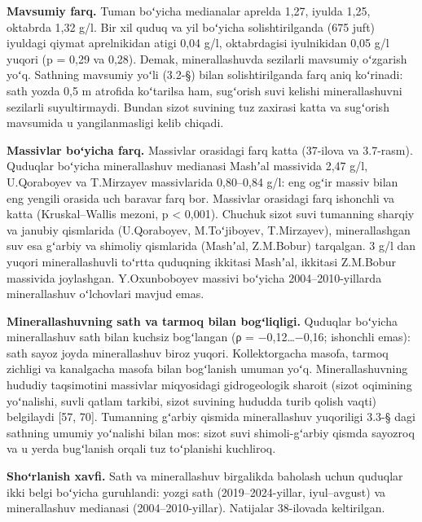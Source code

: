 \textbf{Mavsumiy farq.} Tuman boʻyicha medianalar aprelda 1,27, iyulda
1,25, oktabrda 1,32 g/l. Bir xil quduq va yil boʻyicha solishtirilganda
(675 juft) iyuldagi qiymat aprelnikidan atigi 0,04 g/l, oktabrdagisi
iyulnikidan 0,05 g/l yuqori (p = 0,29 va 0,28). Demak, minerallashuvda
sezilarli mavsumiy oʻzgarish yoʻq. Sathning mavsumiy yoʻli (3.2-§) bilan
solishtirilganda farq aniq koʻrinadi: sath yozda 0,5 m atrofida
koʻtarilsa ham, sugʻorish suvi kelishi minerallashuvni sezilarli
suyultirmaydi. Bundan sizot suvining tuz zaxirasi katta va sugʻorish
mavsumida u yangilanmasligi kelib chiqadi.

\textbf{Massivlar boʻyicha farq.} Massivlar orasidagi farq katta
(37-ilova va 3.7-rasm). Quduqlar boʻyicha minerallashuv medianasi
Mashʼal massivida 2,47 g/l, U.Qoraboyev va T.Mirzayev massivlarida
0,80--0,84 g/l: eng ogʻir massiv bilan eng yengili orasida uch baravar
farq bor. Massivlar orasidagi farq ishonchli va katta (Kruskal--Wallis
mezoni, p \textless{} 0,001). Chuchuk sizot suvi tumanning sharqiy va
janubiy qismlarida (U.Qoraboyev, M.Toʻjiboyev, T.Mirzayev),
minerallashgan suv esa gʻarbiy va shimoliy qismlarida (Mashʼal,
Z.M.Bobur) tarqalgan. 3 g/l dan yuqori minerallashuvli toʻrtta quduqning
ikkitasi Mashʼal, ikkitasi Z.M.Bobur massivida joylashgan. Y.Oxunboboyev
massivi boʻyicha 2004--2010-yillarda minerallashuv oʻlchovlari mavjud
emas.



\textbf{Minerallashuvning sath va tarmoq bilan bogʻliqligi.} Quduqlar
boʻyicha minerallashuv sath bilan kuchsiz bogʻlangan (ρ =
−0,12\ldots−0,16; ishonchli emas): sath sayoz joyda minerallashuv biroz
yuqori. Kollektorgacha masofa, tarmoq zichligi va kanalgacha masofa
bilan bogʻlanish umuman yoʻq. Minerallashuvning hududiy taqsimotini
massivlar miqyosidagi gidrogeologik sharoit (sizot oqimining yoʻnalishi,
suvli qatlam tarkibi, sizot suvining hududda turib qolish vaqti)
belgilaydi {[}57, 70{]}. Tumanning gʻarbiy qismida minerallashuv
yuqoriligi 3.3-§ dagi sathning umumiy yoʻnalishi bilan mos: sizot suvi
shimoli-gʻarbiy qismda sayozroq va u yerda bugʻlanish orqali tuz
toʻplanishi kuchliroq.

\textbf{Shoʻrlanish xavfi.} Sath va minerallashuv birgalikda baholash
uchun quduqlar ikki belgi boʻyicha guruhlandi: yozgi sath
(2019--2024-yillar, iyul--avgust) va minerallashuv medianasi
(2004--2010-yillar). Natijalar 38-ilovada keltirilgan.

